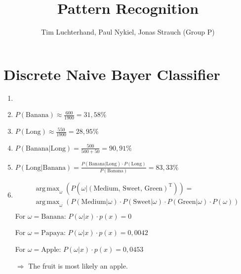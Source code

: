 \documentclass[DIN, pagenumber=false, fontsize=11pt, parskip=half]{scrartcl}
\title{Pattern Recognition}
\author{Tim Luchterhand, Paul Nykiel, Jonas Strauch (Group P)}
\newcommand{\Prb}[1]{P(\text{#1})}
\newcommand{\CPr}[2]{P(\text{#1}|\text{#2})}
\DeclareMathOperator*{\argmax}{arg\,max}
\begin{document}
    \maketitle
    \section{Discrete Naive Bayer Classifier}
    \begin{enumerate}
        \item
        \item
        $\Prb{Banana} \approx \frac{600}{1900} = 31,58\%$
        \item
        $\Prb{Long} \approx \frac{550}{1900} = 28,95\%$
        \item
        $\CPr{Banana}{Long} = \frac{500}{500 + 50} = 90,91\%$
        \item
        $\CPr{Long}{Banana} = \frac{\CPr{Banana}{Long} \cdot \Prb{Long}}{\Prb{Banana}} = 83,33\%$
        \item
        \begin{align*}
            &\argmax_\omega{\left( P\left(\omega | (\text{Medium, Sweet, Green})^\text{T}\right) \right)} = \\
            &\argmax_\omega{\left( P(\text{Medium} | \omega) \cdot P(\text{Sweet} | \omega) \cdot P(\text{Green} | \omega) \cdot P(\omega) \right)} \\
        \end{align*}
        For $\omega = \text{Banana}$: $P(\omega | x) \cdot p(x) = 0$

        For $\omega = \text{Papaya}$: $P(\omega | x) \cdot p(x) = 0,0042$

        For $\omega = \text{Apple}$: $P(\omega | x) \cdot p(x) = 0,0453$

        $\Rightarrow$ The fruit is most likely an apple.
\end{enumerate}
\end{document}
